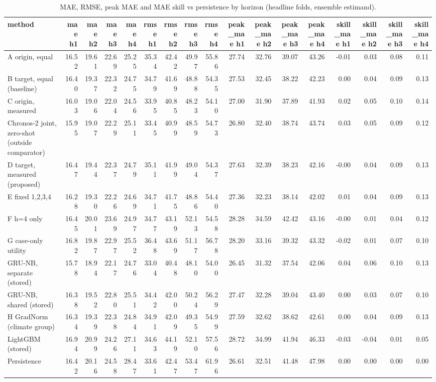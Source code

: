 \begin{table}[t]
\centering
\small
\caption{MAE, RMSE, peak MAE and MAE skill vs persistence by horizon (headline folds, ensemble estimand).}
\label{tab:metrics-headline-ensemble}
\begin{tabular}{lrrrrrrrrrrrrrrrr}
\toprule
method & mae h1 & mae h2 & mae h3 & mae h4 & rmse h1 & rmse h2 & rmse h3 & rmse h4 & peak\_mae h1 & peak\_mae h2 & peak\_mae h3 & peak\_mae h4 & skill\_mae h1 & skill\_mae h2 & skill\_mae h3 & skill\_mae h4 \\
\midrule
A origin, equal & 16.52 & 19.61 & 22.69 & 25.25 & 35.34 & 42.42 & 49.97 & 55.86 & 27.74 & 32.76 & 39.07 & 43.26 & -0.01 & 0.03 & 0.08 & 0.11 \\
B target, equal (baseline) & 16.40 & 19.37 & 22.32 & 24.75 & 34.79 & 41.69 & 48.88 & 54.35 & 27.53 & 32.45 & 38.22 & 42.23 & 0.00 & 0.04 & 0.09 & 0.13 \\
C origin, measured & 16.03 & 19.06 & 22.04 & 24.56 & 33.95 & 40.85 & 48.23 & 54.10 & 27.00 & 31.90 & 37.89 & 41.93 & 0.02 & 0.05 & 0.10 & 0.14 \\
Chronos-2 joint, zero-shot (outside comparator) & 15.95 & 19.07 & 22.29 & 25.11 & 33.45 & 40.99 & 48.59 & 54.73 & 26.80 & 32.40 & 38.74 & 43.74 & 0.03 & 0.05 & 0.09 & 0.12 \\
D target, measured (proposed) & 16.47 & 19.44 & 22.37 & 24.79 & 35.11 & 41.99 & 49.04 & 54.37 & 27.63 & 32.39 & 38.23 & 42.16 & -0.00 & 0.04 & 0.09 & 0.13 \\
E fixed 1,2,3,4 & 16.28 & 19.30 & 22.26 & 24.69 & 34.71 & 41.75 & 48.86 & 54.40 & 27.36 & 32.23 & 38.14 & 42.02 & 0.01 & 0.04 & 0.09 & 0.13 \\
F h=4 only & 16.45 & 20.01 & 23.69 & 24.97 & 34.77 & 43.19 & 52.13 & 54.58 & 28.28 & 34.59 & 42.42 & 43.16 & -0.00 & 0.01 & 0.04 & 0.12 \\
G case-only utility & 16.82 & 19.87 & 22.97 & 25.52 & 36.48 & 43.69 & 51.17 & 56.78 & 28.20 & 33.16 & 39.32 & 43.32 & -0.02 & 0.01 & 0.07 & 0.10 \\
GRU-NB, separate (stored) & 15.78 & 18.94 & 22.17 & 24.76 & 33.04 & 40.48 & 48.10 & 54.00 & 26.45 & 31.32 & 37.54 & 42.06 & 0.04 & 0.06 & 0.10 & 0.13 \\
GRU-NB, shared (stored) & 16.38 & 19.52 & 22.80 & 25.51 & 34.42 & 42.00 & 50.24 & 56.29 & 27.47 & 32.28 & 39.04 & 43.40 & 0.00 & 0.03 & 0.07 & 0.10 \\
H GradNorm (climate group) & 16.34 & 19.39 & 22.38 & 24.84 & 34.91 & 42.09 & 49.35 & 54.99 & 27.59 & 32.62 & 38.62 & 42.61 & 0.00 & 0.04 & 0.09 & 0.13 \\
LightGBM (stored) & 16.94 & 20.99 & 24.26 & 27.11 & 34.63 & 44.19 & 52.10 & 57.56 & 28.72 & 34.99 & 41.94 & 46.33 & -0.03 & -0.04 & 0.01 & 0.05 \\
Persistence & 16.42 & 20.16 & 24.58 & 28.47 & 33.61 & 42.47 & 53.47 & 61.96 & 26.61 & 32.51 & 41.48 & 47.98 & 0.00 & 0.00 & 0.00 & 0.00 \\
\bottomrule
\end{tabular}
\end{table}
